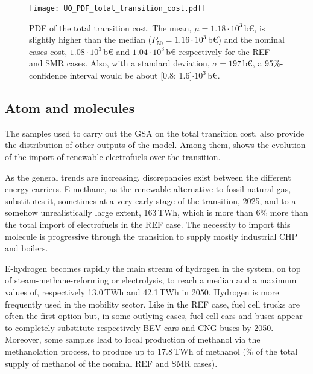 \begin{figure}[htbp!]
\centering
\texttt{[image: UQ\_PDF\_total\_transition\_cost.pdf]}
\caption{\acrfull{PDF} of the total transition cost. The mean, $\mu=1.18\cdot10^3$\,b€, is slightly higher than the median ($P_{50}=1.16\cdot10^3$\,b€) and the nominal cases cost, $1.08\cdot10^3$\,b€ and $1.04\cdot10^3$\,b€ respectively for the REF and SMR cases. Also, with a standard deviation, $\sigma=197$\,b€, a 95\%-confidence interval would be about [0.8; 1.6]$\cdot10^3$\,b€.}
\label{fig:UQ_PDF_total_transition_cost}
\end{figure}

\subsection{Atom and molecules}
\label{subsec:atom_mol:results_atom_mol}
The samples used to carry out the \gls{GSA} on the total transition cost, also provide the distribution of other outputs of the model. Among them,  shows the evolution of the import of renewable electrofuels over the transition.

As the general trends are increasing, discrepancies exist between the different energy carriers. E-methane, as the renewable alternative to fossil natural gas, substitutes it, sometimes at a very early stage of the transition, 2025, and to a somehow unrealistically large extent, 163\,TWh, which is more than 6\% more than the total import of electrofuels in the REF case. The necessity to import this molecule is progressive through the transition to supply mostly industrial \gls{CHP} and boilers. 

E-hydrogen becomes rapidly the main stream of hydrogen in the system, on top of steam-methane-reforming or electrolysis, to reach a median and a maximum values of, respectively 13.0\,TWh and 42.1\,TWh in 2050. Hydrogen is more frequently used in the mobility sector. Like in the REF case, fuel cell trucks are often the first option but, in some outlying cases, fuel cell cars and buses appear to completely substitute respectively \gls{BEV} cars and \gls{CNG} buses by 2050. Moreover, some samples lead to local production of methanol via the methanolation process, to produce up to 17.8\,TWh of methanol (\% of the total supply of methanol of the nominal REF and SMR cases). 

